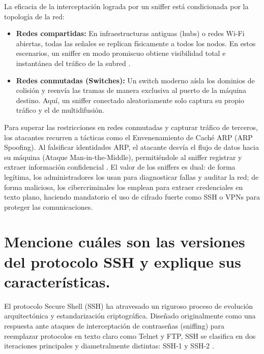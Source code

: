 \documentclass[a4paper,12pt]{article}
\begin{document}
La eficacia de la interceptación lograda por un sniffer está condicionada por la topología de la red:
\begin{itemize}
    \item \textbf{Redes compartidas:} En infraestructuras antiguas (hubs) o redes Wi-Fi abiertas, todas las señales se replican físicamente a todos los nodos. En estos escenarios, un sniffer en modo promiscuo obtiene visibilidad total e instantánea del tráfico de la subred \cite{cdmon_sniffers}.
    \item \textbf{Redes conmutadas (Switches):} Un switch moderno aísla los dominios de colisión y reenvía las tramas de manera exclusiva al puerto de la máquina destino. Aquí, un sniffer conectado aleatoriamente solo captura su propio tráfico y el de multidifusión.
\end{itemize}

Para superar las restricciones en redes conmutadas y capturar tráfico de terceros, los atacantes recurren a tácticas como el Envenenamiento de Caché ARP (ARP Spoofing). Al falsificar identidades ARP, el atacante desvía el flujo de datos hacia su máquina (Ataque Man-in-the-Middle), permitiéndole al sniffer registrar y extraer información confidencial \cite{cdmon_sniffers}. El valor de los sniffers es dual: de forma legítima, los administradores los usan para diagnosticar fallas y auditar la red; de forma maliciosa, los cibercriminales los emplean para extraer credenciales en texto plano, haciendo mandatorio el uso de cifrado fuerte como SSH o VPNs para proteger las comunicaciones.


\section{Mencione cuáles son las versiones del protocolo SSH y explique sus características.}

El protocolo Secure Shell (SSH) ha atravesado un riguroso proceso de evolución arquitectónica y estandarización criptográfica. Diseñado originalmente como una respuesta ante ataques de interceptación de contraseñas (sniffing) para reemplazar protocolos en texto claro como Telnet y FTP, SSH se clasifica en dos iteraciones principales y diametralmente distintas: SSH-1 y SSH-2 \cite{stackscale_ssh}.
\end{document}
